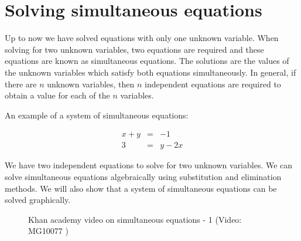 \section{Solving simultaneous equations}

Up to now we have solved equations with only one unknown variable. 
When solving for two unknown variables, two equations are required and these equations are known as simultaneous equations. 
The solutions are the values of the unknown variables which satisfy both equations simultaneously. In general, if there are $n$ unknown variables, then $n$ independent equations are required to obtain a value for each of the $n$ variables.\par 
An example of a system of simultaneous equations:

\begin{equation*}
\begin{array}{rcl} x+y&=&-1 \\ 
 3&=&y-2x 
\end{array}
\end{equation*}

We have two independent equations to solve for two unknown variables. We can solve simultaneous equations algebraically using substitution and elimination methods. We will also show that a system of simultaneous equations can be solved graphically.\par 
\setcounter{subfigure}{0}
\begin{figure}[H] %
\textnormal{Khan academy video on simultaneous equations - 1}\vspace{.1in} \nopagebreak
\label{m39257*yt-media7}\label{m39257*yt-video7}
 { (Video:  MG10077 )}
\vspace{2pt}
\vspace{.1in}
\end{figure}       

